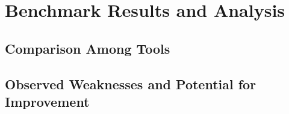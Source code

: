






\section{Benchmark Results and Analysis}
\subsection{Comparison Among Tools}
\subsection{Observed Weaknesses and Potential for Improvement}

